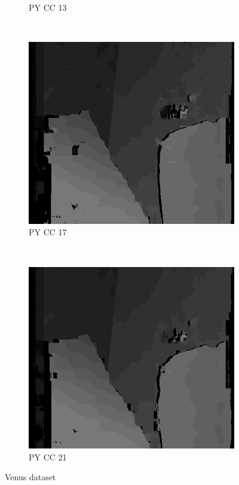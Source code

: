 \begin{figure}
\begin{subfigure}[b]{0.23\textwidth}
    \caption{PY CC 13}
  \end{subfigure}
  ~
  \begin{subfigure}[b]{0.23\textwidth}
    \centering
    \includegraphics[width=\textwidth]{images/stereo-pairs/venus_pyramid_crosschecked_17.png}
    \caption{PY CC 17}
  \end{subfigure}
  ~
  \begin{subfigure}[b]{0.23\textwidth}
    \centering
    \includegraphics[width=\textwidth]{images/stereo-pairs/venus_pyramid_crosschecked_21.png}
    \caption{PY CC 21}
  \end{subfigure}

  \caption{Venus dataset}

\end{figure}

